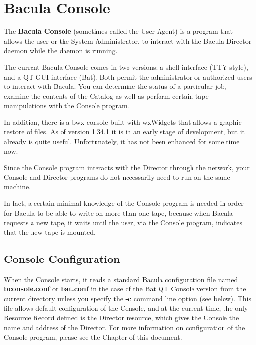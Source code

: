 
\chapter{Bacula Console}
\label{_ConsoleChapter}

The {\bf Bacula Console} (sometimes called the User Agent) is a program that
allows the user or the System Administrator, to interact with the Bacula
Director daemon while the daemon is running. 

The current Bacula Console comes in two versions: a shell interface (TTY
style), and a QT GUI interface (Bat). Both permit the administrator or
authorized users to interact with Bacula. You can determine the status of a
particular job, examine the contents of the Catalog as well as perform certain
tape manipulations with the Console program.

In addition, there is a bwx-console built with wxWidgets that allows a graphic
restore of files. As of version 1.34.1 it is in an early stage of development,
but it already is quite useful. Unfortunately, it has not been enhanced for
some time now.

Since the Console program interacts with the Director through the network, your
Console and Director programs do not necessarily need to run on the same
machine. 

In fact, a certain minimal knowledge of the Console program is needed in order
for Bacula to be able to write on more than one tape, because when Bacula
requests a new tape, it waits until the user, via the Console program,
indicates that the new tape is mounted. 

\section{Console Configuration}

When the Console starts, it reads a standard Bacula configuration file
named {\bf bconsole.conf} or {\bf bat.conf} in the case of the Bat
QT Console version from the current directory unless you specify the {\bf {-}c}
command line option (see below). This file allows default configuration 
of the Console, and at the current time, the only Resource Record defined
is the Director resource, which gives the Console the name and address of
the Director.  For more information on configuration of the Console
program, please see the  Chapter of this document.

